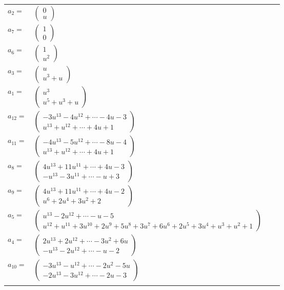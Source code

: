 \documentclass[1p]{elsarticle_modified}
\theoremstyle{definition}
\begin{document}
\begin{tabular}{m{7pt} m{180pt} m{7pt} m{180pt} }
\flushright $a_{2}=$&$\begin{pmatrix}0\\u\end{pmatrix}$ \\
\flushright $a_{7}=$&$\begin{pmatrix}1\\0\end{pmatrix}$ \\
\flushright $a_{6}=$&$\begin{pmatrix}1\\u^2\end{pmatrix}$ \\
\flushright $a_{3}=$&$\begin{pmatrix}u\\u^3+u\end{pmatrix}$ \\
\flushright $a_{1}=$&$\begin{pmatrix}u^3\\u^5+u^3+u\end{pmatrix}$ \\
\flushright $a_{12}=$&$\begin{pmatrix}-3 u^{13}-4 u^{12}+\cdots-4 u-3\\u^{13}+u^{12}+\cdots+4 u+1\end{pmatrix}$ \\
\flushright $a_{11}=$&$\begin{pmatrix}-4 u^{13}-5 u^{12}+\cdots-8 u-4\\u^{13}+u^{12}+\cdots+4 u+1\end{pmatrix}$ \\
\flushright $a_{8}=$&$\begin{pmatrix}4 u^{13}+11 u^{11}+\cdots+4 u-3\\- u^{13}-3 u^{11}+\cdots- u+3\end{pmatrix}$ \\
\flushright $a_{9}=$&$\begin{pmatrix}4 u^{13}+11 u^{11}+\cdots+4 u-2\\u^6+2 u^4+3 u^2+2\end{pmatrix}$ \\
\flushright $a_{5}=$&$\begin{pmatrix}u^{13}-2 u^{12}+\cdots- u-5\\u^{12}+u^{11}+3 u^{10}+2 u^9+5 u^8+3 u^7+6 u^6+2 u^5+3 u^4+u^3+u^2+1\end{pmatrix}$ \\
\flushright $a_{4}=$&$\begin{pmatrix}2 u^{13}+2 u^{12}+\cdots-3 u^2+6 u\\- u^{13}-2 u^{12}+\cdots- u-2\end{pmatrix}$ \\
\flushright $a_{10}=$&$\begin{pmatrix}-3 u^{13}- u^{12}+\cdots-2 u^2-5 u\\-2 u^{13}-3 u^{12}+\cdots-2 u-3\end{pmatrix}$\\&\end{tabular}
\end{document}
